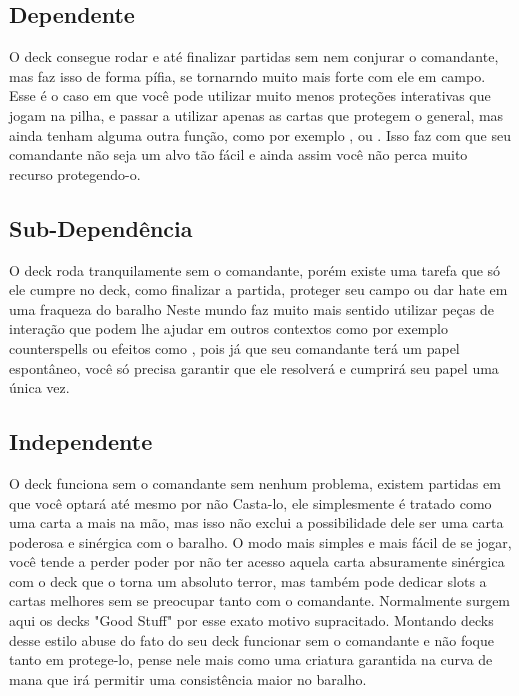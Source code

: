\subsection{Dependente}
O deck consegue rodar e até finalizar partidas sem nem conjurar o comandante, mas faz isso de forma pífia, se tornarndo muito mais forte com ele em campo.
Esse é o caso em que você pode utilizar muito menos proteções interativas que jogam na pilha, e passar a utilizar apenas as cartas que protegem o general, mas ainda tenham alguma outra função, como por exemplo ,  ou .
Isso faz com que seu comandante não seja um alvo tão fácil e ainda assim você não perca muito recurso protegendo-o.


\subsection{Sub-Dependência}
O deck roda tranquilamente sem o comandante, porém existe uma tarefa que só ele cumpre no deck, como finalizar a partida, proteger seu campo ou dar hate em uma fraqueza do baralho
Neste mundo faz muito mais sentido utilizar peças de interação que podem lhe ajudar em outros contextos como por exemplo counterspells ou efeitos como , pois já que seu comandante terá um papel espontâneo, você só precisa garantir que ele resolverá e cumprirá seu papel uma única vez.



\subsection{Independente}
O deck funciona sem o comandante sem nenhum problema, existem partidas em que você optará até mesmo por não Casta-lo, ele simplesmente é tratado como uma carta a mais na mão, mas isso não exclui a possibilidade dele ser uma carta poderosa e sinérgica com o baralho.
O modo mais simples e mais fácil de se jogar, você tende a perder poder por não ter acesso aquela carta absuramente sinérgica com o deck que o torna um absoluto terror, mas também pode dedicar slots a cartas melhores sem se preocupar tanto com o comandante.
Normalmente surgem aqui os decks "Good Stuff" por esse exato motivo supracitado. Montando decks desse estilo abuse do fato do seu deck funcionar sem o comandante e não foque tanto em protege-lo, pense nele mais como uma criatura garantida na curva de mana que irá permitir uma consistência maior no baralho.